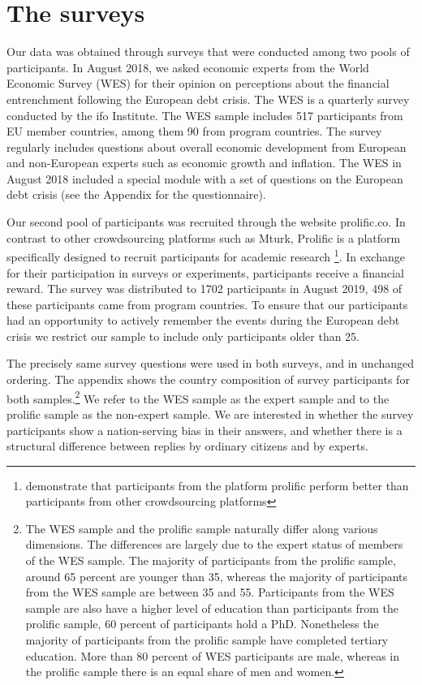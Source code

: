 \section{The surveys }
Our data was obtained through surveys that were conducted among two pools of
participants. In August 2018, we asked economic experts from the World
Economic Survey (WES) for their opinion on perceptions about the financial
entrenchment following the European debt crisis. The WES is a quarterly
survey conducted by the ifo Institute. The WES sample includes 517
participants from EU member countries, among them 90 from program countries.
The survey regularly includes questions about overall economic development
from European and non-European experts such as economic growth and
inflation. The WES in August 2018 included a special module with a set of
questions on the European debt crisis (see the Appendix for the
questionnaire).

Our second pool of participants was recruited through the website
prolific.co. In contrast to other crowdsourcing platforms such as Mturk,
Prolific is a platform specifically designed to recruit participants for
academic research \footnote{\cite{Peer} demonstrate that participants from
the platform prolific perform better than participants from other
crowdsourcing platforms}. In exchange for their participation in surveys or
experiments, participants receive a financial reward. The survey was
distributed to 1702 participants in August 2019, 498 of these participants
came from program countries. To ensure that our participants had an
opportunity to actively remember the events during the European debt crisis
we restrict our sample to include only participants older than 25.

The precisely same survey questions were used in both surveys, and in
unchanged ordering. The appendix shows the country composition of survey
participants for both samples.\footnote{%
The WES sample and the prolific sample naturally differ along various
dimensions. The differences are largely due to the expert status of members
of the WES sample. The majority of participants from the prolific sample,
around 65 percent are younger than 35, whereas the majority of participants
from the WES sample are between 35 and 55. Participants from the WES sample
are also have a higher level of education than participants from the
prolific sample, 60 percent of participants hold a PhD. Nonetheless the
majority of participants from the prolific sample have completed tertiary
education. More than 80 percent of WES participants are male, whereas in the
prolific sample there is an equal share of men and women.} We refer to the
WES sample as the expert sample and to the prolific sample as the non-expert
sample. We are interested in whether the survey participants show a
nation-serving bias in their answers, and whether there is a structural
difference between replies by ordinary citizens and by experts.